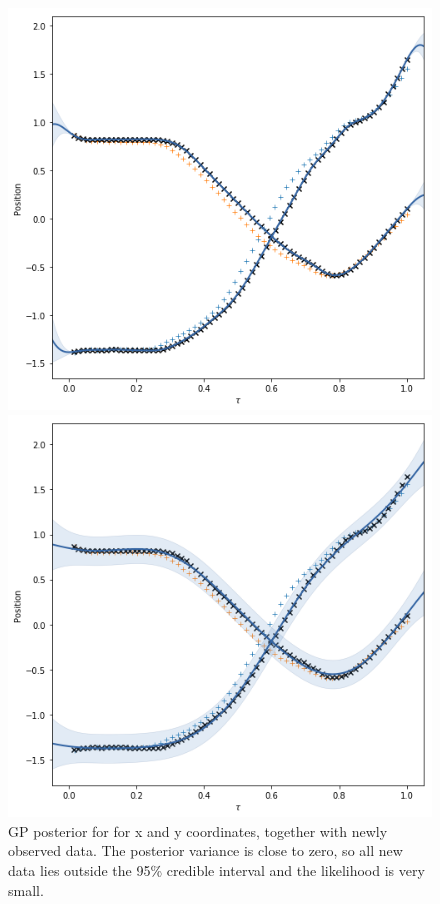 \begin{figure}[H]
  \begin{minipage}{.46\textwidth}
    \includegraphics[width=\textwidth]{figures/too-low-variance}
    \caption{GP posterior for for x and y coordinates, together with newly
      observed data. The posterior variance is close to zero, so all
      new data lies outside the 95\% credible interval and the
      likelihood is very small. }\label{fig:too-small-variance}
  \end{minipage}
  \hspace{5pt}
  \begin{minipage}{.46\textwidth}
    \includegraphics[width=\textwidth]{figures/ok-variance}

\end{minipage}
\end{figure}
